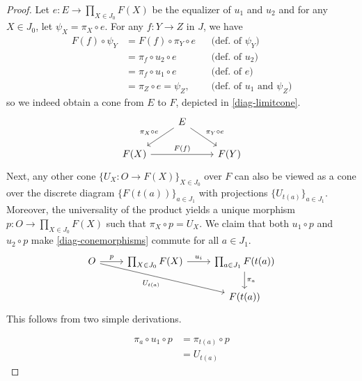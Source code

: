 \documentclass{article}
\theoremstyle{definition}
\theoremstyle{remark}
\begin{document}
\begin{proof}
    Let $e:E\rightarrow \prod_{X\in J_0} F(X)$ be the equalizer of $u_1$ and $u_2$ and for any $X \in J_0$, let $\psi_X = \pi_X \circ e$. For any $f: Y \rightarrow Z$ in $J$, we have 
    \begin{align*}
        F(f) \circ \psi_Y &= F(f) \circ \pi_Y \circ e &&\mbox{(def. of $\psi_Y$)}\\ 
        &= \pi_f \circ u_2 \circ e &&\mbox{(def. of $u_2$)}\\ 
        &= \pi_f \circ u_1 \circ e &&\mbox{(def. of $e$)}\\
        &= \pi_Z \circ e = \psi_Z, &&\mbox{(def. of $u_1$ and $\psi_Z$)}
    \end{align*}
    so we indeed obtain a cone from $E$ to $F$, depicted in \eqref{diag-limitcone}.
    \begin{equation}\label{diag-limitcone}
        \begin{tikzcd}
            & E \arrow[ld, "\pi_X \circ e"'] \arrow[rd, "\pi_Y \circ e"] &      \\
            F(X) \arrow[rr, "F(f)"] & & F(Y)
        \end{tikzcd}
    \end{equation}
    Next, any other cone $\{U_X: O \rightarrow F(X)\}_{X \in J_0}$ over $F$ can also be viewed as a cone over the discrete diagram $\{F(t(a))\}_{a \in J_1}$ with projections $\{U_{t(a)}\}_{a \in J_1}$. Moreover, the universality of the product yields a unique morphism $p: O\rightarrow \prod_{X \in J_0} F(X)$ such that $\pi_X \circ p = U_X$. We claim that both $u_1 \circ p$ and $u_2 \circ p$ make \eqref{diag-conemorphisms} commute for all $a \in J_1$.
    \begin{equation}\label{diag-conemorphisms}
        \begin{tikzcd}
            O \arrow[r, "p"] \arrow[rrd, "U_{t(a)}"'] &\prod_{X \in J_0} F(X) \arrow[r, "u_i"] & \prod_{a \in J_1} F(t(a)) \arrow[d, "\pi_a"] \\
             & & F(t(a))
            \end{tikzcd}
    \end{equation}
    This follows from two simple derivations.\\
    \begin{minipage}{0.45\textwidth}
    \begin{align*}
        \pi_a \circ u_1 \circ p &= \pi_{t(a)} \circ p\\
        &= U_{t(a)}
    \end{align*}
    \end{minipage}

\end{proof}
\end{document}
